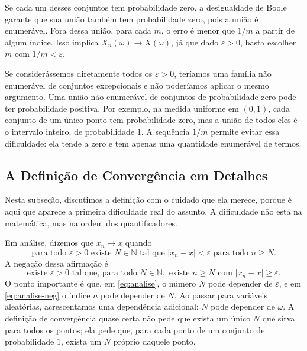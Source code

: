 \documentclass[12pt,portuguese]{article}
\theoremstyle{definition}
\theoremstyle{plainexercise}
\theoremstyle{starredexercise}
\theoremstyle{definition}
\begin{document}
Se cada um desses conjuntos tem probabilidade zero, a desigualdade de Boole
garante que sua união também tem probabilidade zero, pois a união é
enumerável. Fora dessa união, para cada $m$, o erro é menor que $1/m$ a partir
de algum índice.
Isso implica $X_n(\omega)\to X(\omega)$, já que dado $\varepsilon>0$, basta escolher
$m$ com $1/m<\varepsilon$.

Se considerássemos diretamente todos os $\varepsilon>0$, teríamos uma
família não enumerável de conjuntos excepcionais e não poderíamos aplicar
o mesmo argumento. Uma união não enumerável de conjuntos de probabilidade
zero pode ter probabilidade positiva. Por exemplo, na medida uniforme em
$(0,1)$, cada conjunto de um único ponto tem probabilidade zero, mas a união
de todos eles é o intervalo inteiro, de probabilidade $1$. A sequência $1/m$
permite evitar essa dificuldade: ela tende a zero e tem apenas uma
quantidade enumerável de termos.

\subsection{A Definição de Convergência em Detalhes}\label{subsec:qc-epsilon}

Nesta subseção, discutimos a definição com o cuidado que ela merece, porque é
aqui que aparece a primeira dificuldade real do assunto. A dificuldade não está
na matemática, mas na ordem dos quantificadores.

Em análise, dizemos que $x_n\to x$ quando
\begin{equation}\label{eq:analise}
\text{para todo }\varepsilon>0\text{ existe }N\in\mathbb{N}
\text{ tal que }|x_n-x|<\varepsilon\text{ para todo }n\geqslant N.
\end{equation}
A negação dessa afirmação é
\begin{equation}\label{eq:analise-neg}
\text{existe }\varepsilon>0\text{ tal que, para todo }N\in\mathbb{N},
\text{ existe }n\geqslant N\text{ com }|x_n-x|\geqslant\varepsilon.
\end{equation}
O ponto importante é que, em \eqref{eq:analise}, o número $N$ pode depender de
$\varepsilon$, e em \eqref{eq:analise-neg} o índice $n$ pode depender de $N$.
Ao passar para variáveis aleatórias, acrescentamos uma dependência adicional:
$N$ pode depender de $\omega$. A definição de convergência quase certa não pede
que exista um único $N$ que sirva para todos os pontos; ela pede que, para cada
ponto de um conjunto de probabilidade $1$, exista um $N$ próprio daquele ponto.
\end{document}
